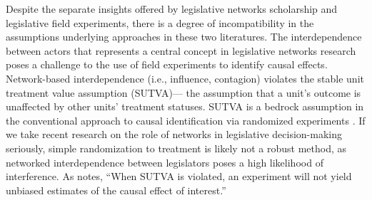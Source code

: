 \documentclass[12pt]{article}
\begin{document}
Despite the separate insights offered by legislative networks scholarship and legislative field experiments, there is a degree of incompatibility in the assumptions underlying approaches in these two literatures. The interdependence between actors that represents a central concept in legislative networks research poses a challenge to the use of field experiments to identify causal effects. Network-based interdependence (i.e., influence, contagion) violates the stable unit treatment value assumption (SUTVA)--- the assumption that a unit's outcome is unaffected by other units' treatment statuses. SUTVA is a bedrock assumption in the conventional approach to causal identification via randomized experiments \citep{sekhon2008}.  If we take recent research on the role of networks in legislative decision-making seriously, simple randomization to treatment is likely not a robust method, as networked interdependence between legislators poses a high likelihood of interference.  As \citet[p. 5]{sekhon2008} notes, ``When SUTVA is violated, an experiment will not yield unbiased estimates of the causal effect of interest.''  
\end{document}
